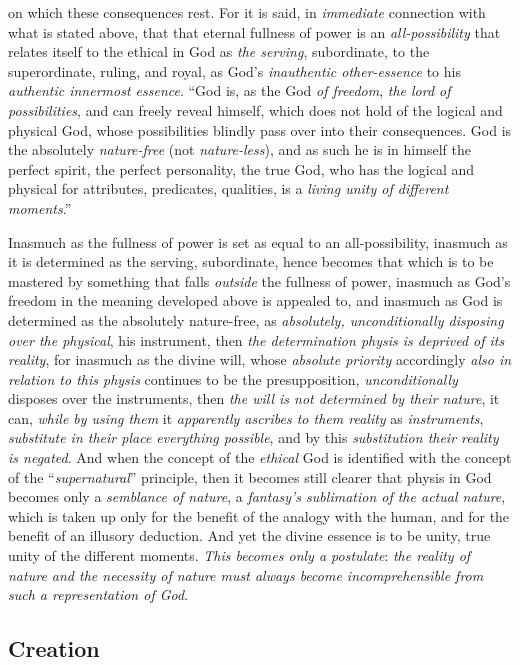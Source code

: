\documentclass[12pt,a4paper]{book}
\begin{document}
on which these consequences rest. For it is said, in \emph{immediate} connection with what is
stated above, that that eternal fullness of power is an \emph{all-possibility} that relates itself
to the ethical in God as \emph{the serving}, subordinate, to the superordinate, ruling, and royal,
as God's \emph{inauthentic other-essence} to his \emph{authentic innermost essence}. ``God is, as the God
\emph{of freedom}, \emph{the lord of possibilities}, and can freely reveal himself, which does not hold of
the logical and physical God, whose possibilities blindly pass over into their consequences.
God is the absolutely \emph{nature-free} (not \emph{nature-less}), and as such he is in himself the perfect
spirit, the perfect personality, the true God, who has the logical and physical for
attributes, predicates, qualities, is a \emph{living unity of different moments}.''

Inasmuch as the fullness of power is set as equal to an all-possibility, inasmuch as it is
determined as the serving, subordinate, hence becomes that which is to be mastered by
something that falls \emph{outside} the fullness of power, inasmuch as God's freedom in the meaning
developed above is appealed to, and inasmuch as God is determined as the absolutely
nature-free, as \emph{absolutely, unconditionally disposing over the physical}, his instrument, then
\emph{the determination physis is deprived of its reality}, for inasmuch as the divine will, whose
\emph{absolute priority} accordingly \emph{also in relation to this physis} continues to be the
presupposition, \emph{unconditionally} disposes over the instruments, then \emph{the will is not determined
by their nature}, it can, \emph{while by using them} it \emph{apparently ascribes to them reality} as
\emph{instruments}, \emph{substitute in their place everything possible}, and by this \emph{substitution their
reality is negated}. And when the concept of the \emph{ethical} God is identified with the concept of
the ``\emph{supernatural}'' principle, then it becomes still clearer that physis in God becomes only
a \emph{semblance of nature}, a \emph{fantasy's sublimation of the actual nature}, which is taken up only
for the benefit of the analogy with the human, and for the benefit of an illusory deduction.
And yet the divine essence is to be unity, true unity of the different moments. \emph{This becomes
only a postulate}: \emph{the reality of nature and the necessity of nature must always become
incomprehensible from such a representation of God}.

\subsection{Creation}
\label{ssec:creation}
\end{document}
